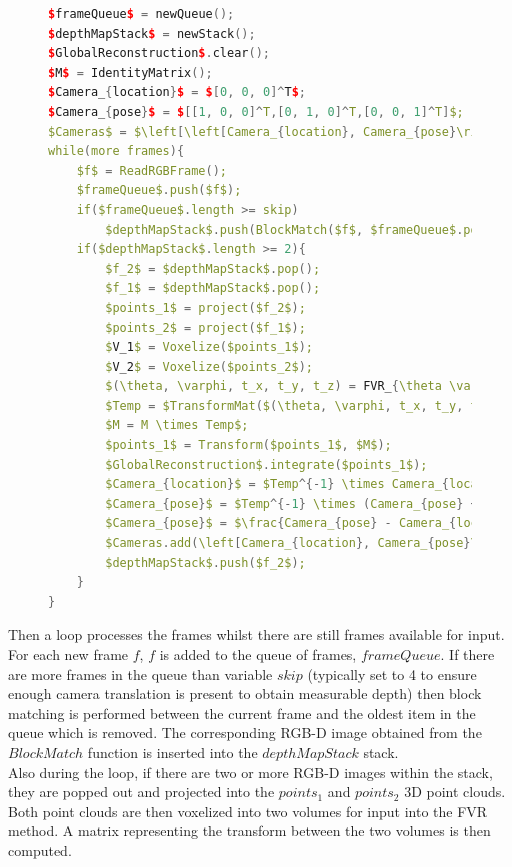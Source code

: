 \begin{figure}
\begin{lstlisting}[language=c++,caption=Monocular View Volume Reconstruction,label=algorithm:MVVRAlgorithm,mathescape,basicstyle=\ttfamily]
$frameQueue$ = newQueue();
$depthMapStack$ = newStack();
$GlobalReconstruction$.clear();
$M$ = IdentityMatrix();
$Camera_{location}$ = $[0, 0, 0]^T$;
$Camera_{pose}$ = $[[1, 0, 0]^T,[0, 1, 0]^T,[0, 0, 1]^T]$;
$Cameras$ = $\left[\left[Camera_{location}, Camera_{pose}\right] \right]$;
while(more frames){
	$f$ = ReadRGBFrame();
	$frameQueue$.push($f$);
	if($frameQueue$.length >= skip)
		$depthMapStack$.push(BlockMatch($f$, $frameQueue$.pop()))
	if($depthMapStack$.length >= 2){
		$f_2$ = $depthMapStack$.pop();
		$f_1$ = $depthMapStack$.pop();
		$points_1$ = project($f_2$);
		$points_2$ = project($f_1$);
		$V_1$ = Voxelize($points_1$);
		$V_2$ = Voxelize($points_2$);
		$(\theta, \varphi, t_x, t_y, t_z) = FVR_{\theta \varphi t_x t_y t_z}(V_1, V_2)$;
		$Temp = $TransformMat($(\theta, \varphi, t_x, t_y, t_z)$);
		$M = M \times Temp$;
		$points_1$ = Transform($points_1$, $M$);
		$GlobalReconstruction$.integrate($points_1$);
		$Camera_{location}$ = $Temp^{-1} \times Camera_{location}$;
		$Camera_{pose}$ = $Temp^{-1} \times (Camera_{pose} + Camera_{location})$;
		$Camera_{pose}$ = $\frac{Camera_{pose} - Camera_{location}}{Camera_{pose} - Camera_{location}}$;
		$Cameras.add(\left[Camera_{location}, Camera_{pose}\right])$;
		$depthMapStack$.push($f_2$);
	}
}
\end{lstlisting}
\end{figure}


Then a loop processes the frames whilst there are still frames available for input. For each new frame $f$, $f$ is added to the queue of frames, $frameQueue$. If there are more frames in the queue than variable $skip$ (typically set to 4 to ensure enough camera translation is present to obtain measurable depth) then block matching is performed between the current frame and the oldest item in the queue which is removed. The corresponding RGB-D image obtained from the $BlockMatch$ function is inserted into the $depthMapStack$ stack. \\

Also during the loop, if there are two or more RGB-D images within the stack, they are popped out and projected into the $points_1$ and $points_2$ 3D point clouds. Both point clouds are then voxelized into two volumes for input into the FVR method. A matrix representing the transform between the two volumes is then computed. \\

